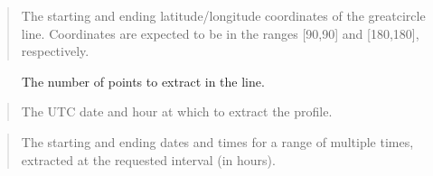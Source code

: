 \documentclass[letterpaper,10pt,english]{sphinxmanual}
\begin{document}
\sphinxAtStartPar
{}

\sphinxAtStartPar
{}
\begin{quote}

\sphinxAtStartPar
The starting and ending latitude/longitude coordinates of the great\sphinxhyphen{}circle line.  Coordinates are expected to be in the ranges {[}\sphinxhyphen{}90,90{]} and {[}\sphinxhyphen{}180,180{]}, respectively.
\end{quote}
\begin{description}
\item[{}] \leavevmode
\sphinxAtStartPar
The number of points to extract in the line.

\end{description}

\sphinxAtStartPar
{}

\sphinxAtStartPar
{}
\begin{quote}

\sphinxAtStartPar
The UTC date and hour  at which to extract the profile.
\end{quote}

\sphinxAtStartPar
{}

\sphinxAtStartPar
{}
\begin{quote}

\sphinxAtStartPar
The starting and ending dates and times for a range of multiple times, extracted at the requested interval (in hours).
\end{quote}
\end{document}
